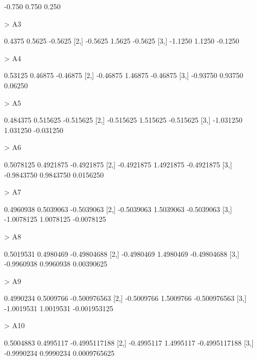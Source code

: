 \documentclass{article}
\begin{document}
\begin{Schunk}
\begin{Soutput}
[3,] -0.750 0.750  0.250
\end{Soutput}
\begin{Sinput}
> A3
\end{Sinput}
\begin{Soutput}
        [,1]   [,2]    [,3]
[1,]  0.4375 0.5625 -0.5625
[2,] -0.5625 1.5625 -0.5625
[3,] -1.1250 1.1250 -0.1250
\end{Soutput}
\begin{Sinput}
> A4
\end{Sinput}
\begin{Soutput}
         [,1]    [,2]     [,3]
[1,]  0.53125 0.46875 -0.46875
[2,] -0.46875 1.46875 -0.46875
[3,] -0.93750 0.93750  0.06250
\end{Soutput}
\begin{Sinput}
> A5
\end{Sinput}
\begin{Soutput}
          [,1]     [,2]      [,3]
[1,]  0.484375 0.515625 -0.515625
[2,] -0.515625 1.515625 -0.515625
[3,] -1.031250 1.031250 -0.031250
\end{Soutput}
\begin{Sinput}
> A6
\end{Sinput}
\begin{Soutput}
           [,1]      [,2]       [,3]
[1,]  0.5078125 0.4921875 -0.4921875
[2,] -0.4921875 1.4921875 -0.4921875
[3,] -0.9843750 0.9843750  0.0156250
\end{Soutput}
\begin{Sinput}
> A7
\end{Sinput}
\begin{Soutput}
           [,1]      [,2]       [,3]
[1,]  0.4960938 0.5039063 -0.5039063
[2,] -0.5039063 1.5039063 -0.5039063
[3,] -1.0078125 1.0078125 -0.0078125
\end{Soutput}
\begin{Sinput}
> A8
\end{Sinput}
\begin{Soutput}
           [,1]      [,2]        [,3]
[1,]  0.5019531 0.4980469 -0.49804688
[2,] -0.4980469 1.4980469 -0.49804688
[3,] -0.9960938 0.9960938  0.00390625
\end{Soutput}
\begin{Sinput}
> A9
\end{Sinput}
\begin{Soutput}
           [,1]      [,2]         [,3]
[1,]  0.4990234 0.5009766 -0.500976563
[2,] -0.5009766 1.5009766 -0.500976563
[3,] -1.0019531 1.0019531 -0.001953125
\end{Soutput}
\begin{Sinput}
> A10
\end{Sinput}
\begin{Soutput}
           [,1]      [,2]          [,3]
[1,]  0.5004883 0.4995117 -0.4995117188
[2,] -0.4995117 1.4995117 -0.4995117188
[3,] -0.9990234 0.9990234  0.0009765625
\end{Soutput}
\end{Schunk}
\end{document}
